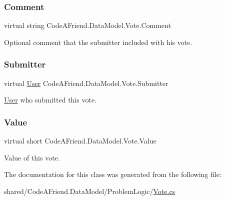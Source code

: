 \subsubsection{\texorpdfstring{Comment}{Comment}}
{\footnotesize\ttfamily virtual string Code\+A\+Friend.\+Data\+Model.\+Vote.\+Comment\hspace{0.3cm}{\ttfamily [get]}}



Optional comment that the submitter included with his vote.

\mbox{\label{class_code_a_friend_1_1_data_model_1_1_vote_a98ece4448b25e79c07024c16e412e2c3}} 
\subsubsection{\texorpdfstring{Submitter}{Submitter}}
{\footnotesize\ttfamily virtual \mbox{\hyperlink{class_code_a_friend_1_1_data_model_1_1_user}{User}} Code\+A\+Friend.\+Data\+Model.\+Vote.\+Submitter\hspace{0.3cm}{\ttfamily [get]}}



\mbox{\hyperlink{class_code_a_friend_1_1_data_model_1_1_user}{User}} who submitted this vote.

\mbox{\label{class_code_a_friend_1_1_data_model_1_1_vote_ac3c1e83e785dfc50317e3ca88e5efd4b}} 
\subsubsection{\texorpdfstring{Value}{Value}}
{\footnotesize\ttfamily virtual short Code\+A\+Friend.\+Data\+Model.\+Vote.\+Value\hspace{0.3cm}{\ttfamily [get]}}



Value of this vote.



The documentation for this class was generated from the following file\+:\begin{DoxyCompactItemize}
\item 
shared/\+Code\+A\+Friend.\+Data\+Model/\+Problem\+Logic/\mbox{\hyperlink{_vote_8cs}{Vote.\+cs}}\end{DoxyCompactItemize}
